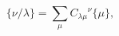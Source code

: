 \begin{equation}
{\{}\nu /\lambda {\}} = \sum_{\mu} {C_{\lambda \mu}}^{\nu} {\{}\mu 
{\}},
\label{eq:Skew}
\end{equation}

